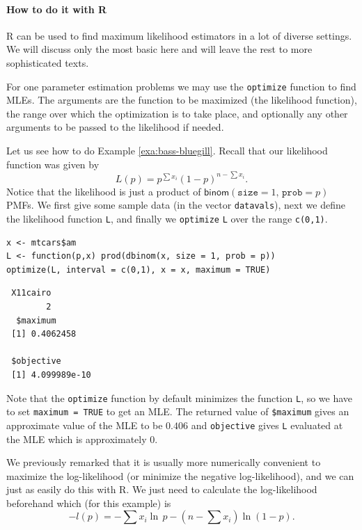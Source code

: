 \documentclass[captions=tableheading]{scrbook}
\begin{document}
\paragraph*{How to do it with \textsf{R}}

\textsf{R} can be used to find maximum likelihood estimators in a lot of diverse settings. We will discuss only the most basic here and will leave the rest to more sophisticated texts.

For one parameter estimation problems we may use the \texttt{optimize} function to find MLEs. The arguments are the function to be maximized (the likelihood function), the range over which the optimization is to take place, and optionally any other arguments to be passed to the likelihood if needed.

Let us see how to do Example \ref{exa:bass-bluegill}. Recall that our likelihood function was given by
\begin{equation}
L(p)=p^{\sum x_{i}}(1-p)^{n-\sum x_{i}}.
\end{equation}
Notice that the likelihood is just a product of \(\mathsf{binom}(\mathtt{size}=1,\,\mathtt{prob}=p)\) PMFs. We first give some sample data (in the vector \texttt{datavals}), next we define the likelihood function \texttt{L}, and finally we \texttt{optimize} \texttt{L} over the range \texttt{c(0,1)}.


\begin{verbatim}
x <- mtcars$am
L <- function(p,x) prod(dbinom(x, size = 1, prob = p))
optimize(L, interval = c(0,1), x = x, maximum = TRUE)
\end{verbatim}

\begin{verbatim}
 X11cairo 
        2
  $maximum
 [1] 0.4062458
 
 $objective
 [1] 4.099989e-10
\end{verbatim}



Note that the \texttt{optimize} function by default minimizes the function \texttt{L}, so we have to set \texttt{maximum = TRUE} to get an MLE. The returned value of \texttt{\$maximum} gives an approximate value of the MLE to be \(  0.406 \) and \texttt{objective} gives \texttt{L} evaluated at the MLE which is approximately \(  0 \).

We previously remarked that it is usually more numerically convenient to maximize the log-likelihood (or minimize the negative log-likelihood), and we can just as easily do this with \textsf{R}. We just need to calculate the log-likelihood beforehand which (for this example) is
\[
-l(p)=-\sum x_{i}\ln\, p-\left(n-\sum x_{i}\right)\ln(1-p).
\]
\end{document}
